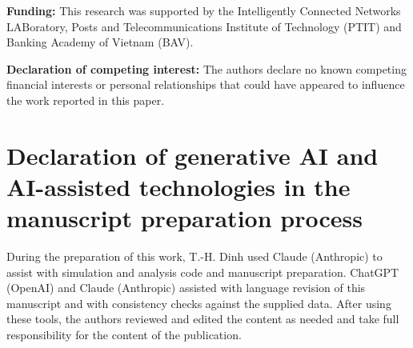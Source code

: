\documentclass[preprint,12pt]{elsarticle}
\begin{document}
\textbf{Funding:} This research was supported by the Intelligently Connected Networks LABoratory, Posts and Telecommunications Institute of Technology (PTIT) and Banking Academy of Vietnam (BAV).
\par\textbf{Declaration of competing interest:} The authors declare no known competing financial interests or personal relationships that could have appeared to influence the work reported in this paper.

\section*{Declaration of generative AI and AI-assisted technologies in the manuscript preparation process}
During the preparation of this work, T.-H. Dinh used Claude (Anthropic) to assist with simulation and analysis code and manuscript preparation. ChatGPT (OpenAI) and Claude (Anthropic) assisted with language revision of this manuscript and with consistency checks against the supplied data. After using these tools, the authors reviewed and edited the content as needed and take full responsibility for the content of the publication.

\end{document}
